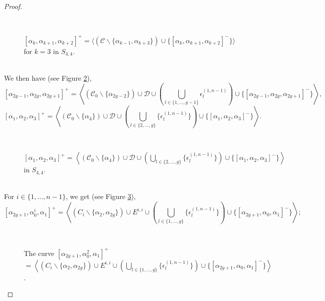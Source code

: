 \documentclass[twoside,11pt,a4paper]{article}
\newcommand*{\Cf}{\mathscr{C}}
\newcommand*{\Df}{\mathscr{D}}
\newcommand*{\epsp}[3]{\epsilon_{#1}^{(#2,#3)}}
\begin{document}
\begin{proof}
\begin{figure}[h]
 \begin{center}
  \resizebox{8cm}{!}{} \\[0.2cm]
  \resizebox{8cm}{!}{} \caption{$[\alpha_{k},\alpha_{k+1},\alpha_{k+2}]^{+} = \langle (\Cf \backslash \{\alpha_{k-1},\alpha_{k+3}\}) \cup \{[\alpha_{k},\alpha_{k+1},\alpha_{k+2}]^{-}\}\rangle$ for $k = 3$ in $S_{4,4}$.}\label{Translemaprop1fig7}
 \end{center}
\end{figure}\\
 We then have (see Figure \ref{Translemaprop1fig9}), $$[\alpha_{2g-1}, \alpha_{2g}, \alpha_{2g+1}]^{+} = \left\langle (\Cf_{0} \backslash \{\alpha_{2g-2}\}) \cup \Df \cup \left(\bigcup_{l \in \{1, \ldots, g-1\}} \epsp{l}{1}{n-1}\right) \cup \{[\alpha_{2g-1},\alpha_{2g},\alpha_{2g+1}]^{-}\}\right\rangle,$$ $$[\alpha_{1}, \alpha_{2}, \alpha_{3}]^{+} = \left\langle (\Cf_{0} \backslash \{\alpha_{4}\}) \cup \Df \cup \left( \bigcup_{l \in \{2, \ldots, g\}} \{\epsp{l}{1}{n-1}\} \right) \cup \{[\alpha_{1}, \alpha_{2}, \alpha_{3}]^{-}\}\right\rangle.$$
\begin{figure}[h]
 \begin{center}
  \resizebox{8cm}{!}{} \\[0.2cm]
  \resizebox{8cm}{!}{} \caption{$[\alpha_{1}, \alpha_{2}, \alpha_{3}]^{+} = \left\langle (\Cf_{0} \backslash \{\alpha_{4}\}) \cup \Df \cup \left( \bigcup_{l \in \{2, \ldots, g\}} \{\epsp{l}{1}{n-1}\} \right) \cup \{[\alpha_{1}, \alpha_{2}, \alpha_{3}]^{-}\}\right\rangle$ in $S_{4,4}$.} \label{Translemaprop1fig9}
 \end{center}
\end{figure}\\
 For $i \in \{1, \ldots, n-1\}$, we get (see Figure \ref{DefAlpha2gplus1Alpha0iAlpha1plusfig1}), $$[\alpha_{2g+1}, \alpha_{0}^{i}, \alpha_{1}]^{+} = \left\langle (C_{i} \backslash \{\alpha_{2}, \alpha_{2g}\}) \cup E^{i,i} \cup \left(\bigcup_{l \in \{1, \ldots, g\}} \{\epsp{l}{1}{n-1}\} \right) \cup \{[\alpha_{2g+1}, \alpha_{0}, \alpha_{1}]^{-}\}\right\rangle;$$ 
\begin{figure}[h]
 \begin{center}
  \resizebox{8cm}{!}{} \\[0.2cm]
  \resizebox{8cm}{!}{} \caption{The curve $[\alpha_{2g+1}, \alpha_{0}^{2}, \alpha_{1}]^{+}$ $= \left\langle (C_{i} \backslash \{\alpha_{2}, \alpha_{2g}\}) \cup E^{i,i} \cup \left(\bigcup_{l \in \{1, \ldots, g\}} \{\epsp{l}{1}{n-1}\} \right) \cup \{[\alpha_{2g+1}, \alpha_{0}, \alpha_{1}]^{-}\}\right\rangle$.} \label{DefAlpha2gplus1Alpha0iAlpha1plusfig1}

\end{center}
\end{figure}
\end{proof}
\end{document}
